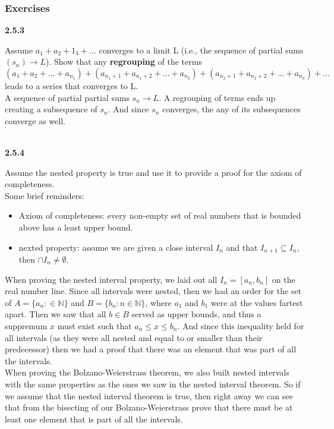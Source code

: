 \subsubsection{Exercises}

\textbf{2.5.3}

Assume $a_1 + a_2 + 1_3 + \ldots$ converges to a limit L
(i.e., the sequence of partial sums $(s_n) \rightarrow L$).
Show that any \textbf{regrouping} of the terms
$$
\left(a_1 + a_2 + \ldots + a_{n_1}\right) +
\left(a_{n_1 +1} + a_{n_1 +2} + \ldots + a_{n_2}\right) +
\left(a_{n_2 +1} + a_{n_2 +2} + \ldots + a_{n_3}\right) +
\ldots
$$
leads to a series that converges to L.
\\

A sequence of partial partial sums $s_n \rightarrow L$.
A regrouping of terms ends up creating a subsequence of $s_n$.
And since $s_n$ converges, the any of its subsequences converge as well.
\\~\\


\label{abbott:2.5.4}

\textbf{2.5.4}

Assume the nested property is true and use it to provide a proof for the axiom of completeness.
\\

Some brief reminders:
\begin{itemize}
    \item Axiom of completeness: every non-empty set of real numbers that is bounded above has a least upper bound.
    \item nexted property: assume we are given a close interval $I_n$ and that $I_{n+1} \subseteq I_n$, then $\cap I_n \neq \emptyset$.
\end{itemize}

When proving the nested interval property, we laid out all $I_n = [a_n, b_n]$ on the real number line.
Since all intervals were nested, then we had an order for the set of $A = \{a_n : \in\mathbb{N}\}$
and $B = \{b_n : n\in\mathbb{N}\}$, where $a_1$ and $b_1$ were at the values fartest apart.
Then we saw that all $b\in B$ served as upper bounds, and thus a suppremum $x$ must exist such that
$a_n \leq x \leq b_n$.
And since this inequality held for all intervals (as they were all nested and equal to or smaller than their predecessor)
then we had a proof that there was an element that was part of all the intervals.
\\

When proving the Bolzano-Weierstrass theorem, we also built nested intervals with the same properties
as the ones we saw in the nested interval theorem.
So if we assume that the nested interval theorem is true, then right away we can see that
from the bisecting of our Bolzano-Weierstrass prove that there must be at least one element that is
part of all the intervals.

